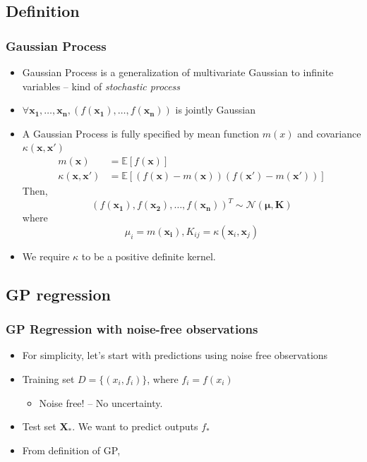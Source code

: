 \documentclass{beamer}
\begin{document}
\subsection{Definition}
\begin{frame}
	\frametitle{Gaussian Process}
	\begin{itemize}
		\item Gaussian Process is a generalization of multivariate Gaussian to infinite variables -- kind of {\em stochastic process}
		\item $\forall \mathbf{x_1}, \ldots, \mathbf{x_n}, (f(\mathbf{x_1}), \ldots, f(\mathbf{x_n}))$ is jointly Gaussian
		\item A Gaussian Process is fully specified by mean function $m(x)$ and covariance $\kappa(\mathbf{x}, \mathbf{x'})$
		\begin{align*}
				m(\mathbf{x}) &= \mathbb{E}[f(\mathbf{x})] \\
				\kappa(\mathbf{\mathbf{x}}, \mathbf{\mathbf{x'}}) &= \mathbb{E}[(f(\mathbf{x})-m(\mathbf{x}))(f(\mathbf{x'})-m(\mathbf{x'}))]				
		\end{align*}	
		Then, 
		\[
			 (f(\mathbf{x_1}), f(\mathbf{x_2}), \ldots, f(\mathbf{x_n}))^T \sim \mathcal{N}(\mathbf{\mu}, \mathbf{K})			 
		\]
		where
		\[
			\mu_i = m(\mathbf{x_i}), K_{ij} = \kappa(\mathbf{x}_i, \mathbf{x}_j)
		\]
		\item We require $\kappa$ to be a positive definite kernel.
	\end{itemize}
\end{frame}
\subsection{GP regression}
\begin{frame}
	\frametitle{GP Regression with noise-free observations}
	\begin{itemize}
			\item For simplicity, let's start with predictions using noise free observations
			\item Training set $D=\{(x_i, f_i)\}$, where $f_i=f(x_i)$
				\begin{itemize}
					\item Noise free! -- No uncertainty.
				\end{itemize}
			\item Test set $\mathbf{X_*}$. We want to predict outputs $f_*$
			\item From definition of GP,
			\[
			\]
	\end{itemize}
\end{frame}
\end{document}
